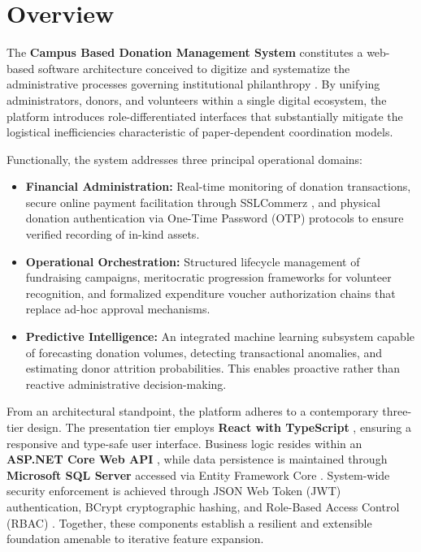\documentclass{thesis-library}
\begin{document}
\newpage
{}

\newpage
\section{Overview}
The \textbf{Campus Based Donation Management System} constitutes a web-based software architecture conceived to digitize and systematize the administrative processes governing institutional philanthropy \cite{robinson2019digital,sander2021digital}. By unifying administrators, donors, and volunteers within a single digital ecosystem, the platform introduces role-differentiated interfaces that substantially mitigate the logistical inefficiencies characteristic of paper-dependent coordination models.

Functionally, the system addresses three principal operational domains:
\begin{itemize}
    \item \textbf{Financial Administration:} Real-time monitoring of donation transactions, secure online payment facilitation through SSLCommerz \cite{hossain2019e}, and physical donation authentication via One-Time Password (OTP) protocols to ensure verified recording of in-kind assets.
    \item \textbf{Operational Orchestration:} Structured lifecycle management of fundraising campaigns, meritocratic progression frameworks for volunteer recognition, and formalized expenditure voucher authorization chains that replace ad-hoc approval mechanisms.
    \item \textbf{Predictive Intelligence:} An integrated machine learning subsystem capable of forecasting donation volumes, detecting transactional anomalies, and estimating donor attrition probabilities. This enables proactive rather than reactive administrative decision-making.
\end{itemize}

From an architectural standpoint, the platform adheres to a contemporary three-tier design. The presentation tier employs \textbf{React with TypeScript} \cite{freeman2021react,cherny2019programming}, ensuring a responsive and type-safe user interface. Business logic resides within an \textbf{ASP.NET Core Web API} \cite{lock2021aspnet,masse2011rest}, while data persistence is maintained through \textbf{Microsoft SQL Server} accessed via Entity Framework Core \cite{lerman2020efcore,coronel2016database}. System-wide security enforcement is achieved through JSON Web Token (JWT) authentication, BCrypt cryptographic hashing, and Role-Based Access Control (RBAC) \cite{sandhu1996rbac}. Together, these components establish a resilient and extensible foundation amenable to iterative feature expansion.
\end{document}
